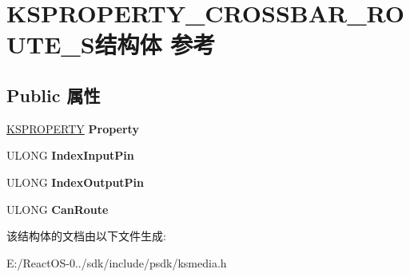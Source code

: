 \hypertarget{struct_k_s_p_r_o_p_e_r_t_y___c_r_o_s_s_b_a_r___r_o_u_t_e___s}{}\section{K\+S\+P\+R\+O\+P\+E\+R\+T\+Y\+\_\+\+C\+R\+O\+S\+S\+B\+A\+R\+\_\+\+R\+O\+U\+T\+E\+\_\+\+S结构体 参考}
\label{struct_k_s_p_r_o_p_e_r_t_y___c_r_o_s_s_b_a_r___r_o_u_t_e___s}
\subsection*{Public 属性}
\begin{DoxyCompactItemize}
\item 
\mbox{\label{struct_k_s_p_r_o_p_e_r_t_y___c_r_o_s_s_b_a_r___r_o_u_t_e___s_a2e6534800abec1c664fc4c9a24f7453f}} 
\hyperlink{struct_k_s_i_d_e_n_t_i_f_i_e_r}{K\+S\+P\+R\+O\+P\+E\+R\+TY} {\bfseries Property}
\item 
\mbox{\label{struct_k_s_p_r_o_p_e_r_t_y___c_r_o_s_s_b_a_r___r_o_u_t_e___s_ad49aece064e69f3ee9ef3142486104f7}} 
U\+L\+O\+NG {\bfseries Index\+Input\+Pin}
\item 
\mbox{\label{struct_k_s_p_r_o_p_e_r_t_y___c_r_o_s_s_b_a_r___r_o_u_t_e___s_a58386181a356de6c6269d1b124c786a4}} 
U\+L\+O\+NG {\bfseries Index\+Output\+Pin}
\item 
\mbox{\label{struct_k_s_p_r_o_p_e_r_t_y___c_r_o_s_s_b_a_r___r_o_u_t_e___s_acea308f6937f9e9d9a459d8bb2b53430}} 
U\+L\+O\+NG {\bfseries Can\+Route}
\end{DoxyCompactItemize}


该结构体的文档由以下文件生成\+:\begin{DoxyCompactItemize}
\item 
E\+:/\+React\+O\+S-\/0../sdk/include/psdk/ksmedia.\+h\end{DoxyCompactItemize}
